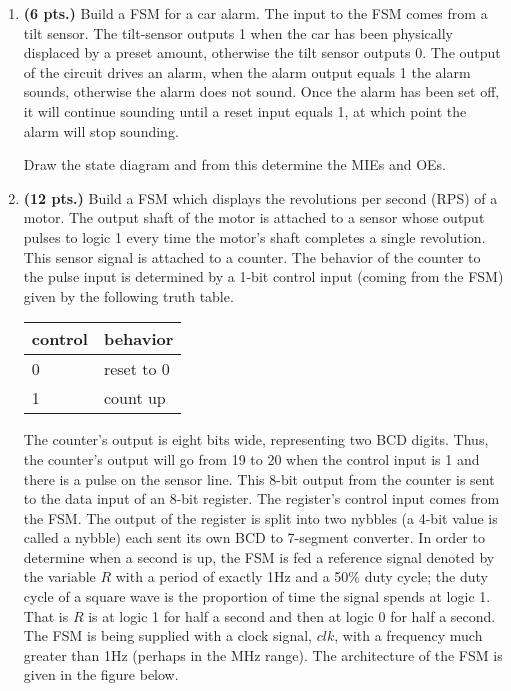 \begin{enumerate}
    \item \textbf{ (6 pts.)}
        Build a FSM for a car alarm.  The input to the FSM
        comes from a tilt sensor.  The tilt-sensor outputs 1 when the
        car has been physically displaced by a preset amount, otherwise the
        tilt sensor outputs 0.  The output of the circuit drives an alarm,
        when the alarm output equals 1 the alarm sounds, otherwise the alarm
        does not sound.  Once the alarm has been set off, it will continue
        sounding until a reset input equals 1, at which point the alarm will
        stop sounding.

        Draw the state diagram and from this determine the MIEs and OEs.

    \item \textbf{ (12 pts.)}
        Build a FSM which displays the revolutions per second
        (RPS) of a motor.  The output shaft of the motor is attached to
        a sensor whose output pulses to logic 1 every time the motor's shaft
        completes a single revolution.  This sensor signal is attached to
        a counter.  The behavior of the counter to the pulse input is determined
        by a 1-bit control input (coming from the FSM) given by the following
        truth table.

        \begin{tabular}{l|l}
            control & behavior \\ \hline \hline
            0    & reset to 0 \\ \hline
            1    & count up \\
        \end{tabular}

        The counter's output is eight bits wide, representing two BCD digits.  Thus,
        the counter's output will go from 19 to 20 when the control input is 1
        and there is a pulse on the sensor line.  This 8-bit output from the
        counter is sent to the data input of an 8-bit register.  The register's
        control input comes from the FSM.  The output of the register is split
        into two nybbles (a 4-bit value is called a nybble)
        each sent its own BCD to 7-segment converter.  In order to determine
        when a second is up, the FSM is fed a reference signal denoted by
        the variable $R$ with a period of exactly 1Hz and a 50\% duty cycle;
        the duty cycle of a square wave is the proportion of time the signal
        spends at logic 1.   That is $R$ is at logic 1 for half a second and
        then at logic 0 for half a second.  The FSM is being supplied with a
        clock signal, $clk$, with a frequency much greater than 1Hz (perhaps
        in the MHz range).  The architecture of the FSM is given in
        the figure below.


\end{enumerate}
